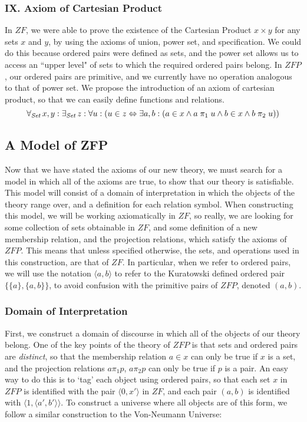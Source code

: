 \documentclass[11pt]{article}
\newcommand{\all}[1]{\forall_{\mathit{#1}}\hspace{0.5mm}}
\newcommand{\ex}[1]{\exists_{\mathit{#1}}\hspace{0.5mm}}
\newcommand{\pleft}{\mathrel{\pi_1}}
\newcommand{\pright}{\mathrel{\pi_2}}
\newcommand{\pair}[2]{\langle #1,#2 \rangle}
\theoremstyle{definition}
\theoremstyle{theorem}
\theoremstyle{lemma}
\begin{document}
\subsubsection*{IX. Axiom of Cartesian Product}
In $\mathit{ZF}$, we were able to prove the existence of the Cartesian Product $x \times y$ for any sets $x$ and $y$, by using the axioms of union, power set, and specification.
We could do this because ordered pairs were defined as sets, and the power set allows us to access an ``upper level" of sets to which the required ordered pairs belong.
In $\mathit{ZFP}$, our ordered pairs are primitive, and we currently have no operation analogous to that of power set.
We propose the introduction of an axiom of cartesian product, so that we can easily define functions and relations.
$$\all{Set} x,y: \ex{Set} z:
 \forall u: (u \in z \Leftrightarrow
 \exists a,b: (a \in x \wedge a\pleft u \wedge b\in x \wedge b\pright u))$$

\subsection{A Model of ZFP}
Now that we have stated the axioms of our new theory, we must search for a model in which all of the axioms are true, to show that our theory is satisfiable.
This model will consist of a domain of interpretation in which the objects of the theory range over, and a definition for each relation symbol.
When constructing this model, we will be working axiomatically in $\mathit{ZF}$, so really, we are looking for some collection of sets obtainable in $\mathit{ZF}$, and some definition of a new membership relation, and the projection relations, which satisfy the axioms of $\mathit{ZFP}$.
This means that unless specified otherwise, the sets, and operations used in this construction, are that of $\mathit{ZF}$.
In particular, when we refer to ordered pairs, we will use the notation $\pair{a}{b}$ to refer to the Kuratowski defined ordered pair $\{\{a\}, \{a,b\}\}$, to avoid confusion with the primitive pairs of $\mathit{ZFP}$, denoted $(a,b)$.

\subsubsection{Domain of Interpretation}
First, we construct a domain of discourse in which all of the objects of our theory belong.
One of the key points of the theory of $\mathit{ZFP}$ is that sets and ordered pairs are \emph{distinct}, so that the membership relation $a\in x$ can only be true if $x$ is a set, and the projection relations $a\pleft p$, $a\pright p$ can only be true if $p$ is a pair.
An easy way to do this is to `tag' each object using ordered pairs, so that each set $x$ in $\mathit{ZFP}$ is identified with the pair $\pair{0}{x'}$ in $\mathit{ZF}$, and each pair $(a,b)$ is identified with $\pair{1}{\pair{a'}{b'}}$. To construct a universe where all objects are of this form, we follow a similar construction to the Von-Neumann Universe:
\end{document}
